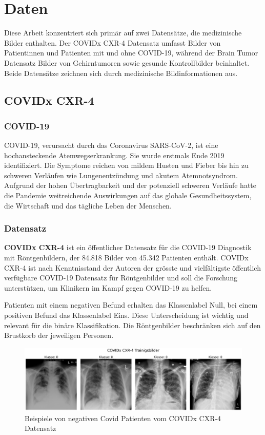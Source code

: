 \section{Daten}\label{chap:Daten} 
Diese Arbeit konzentriert sich primär auf zwei Datensätze, die medizinische Bilder enthalten. Der COVIDx CXR-4 Datensatz umfasst Bilder von Patientinnen und Patienten mit und ohne COVID-19, während der Brain Tumor Datensatz Bilder von Gehirntumoren sowie gesunde Kontrollbilder beinhaltet. Beide Datensätze zeichnen sich durch medizinische Bildinformationen aus.

\subsection{COVIDx CXR-4} \label{chap:COVIDx CXR-4}

\subsubsection{COVID-19} \label{chap:COVID-19}
COVID-19, verursacht durch das Coronavirus SARS-CoV-2, ist eine hochansteckende Atemwegserkrankung. Sie wurde erstmals Ende 2019 identifiziert. Die Symptome reichen von mildem Husten und Fieber bis hin zu schweren Verläufen wie Lungenentzündung und akutem Atemnotsyndrom. Aufgrund der hohen Übertragbarkeit und der potenziell schweren Verläufe hatte die Pandemie weitreichende Auswirkungen auf das globale Gesundheitssystem, die Wirtschaft und das tägliche Leben der Menschen.

\subsubsection{Datensatz} \label{chap:COVID19-datensatz}
\textbf{COVIDx CXR-4} \cite{wu_covidx_2023} ist ein öffentlicher Datensatz für die COVID-19 Diagnostik mit Röntgenbildern, der 84.818 Bilder von 45.342 Patienten enthält. COVIDx CXR-4 ist nach Kenntnisstand der Autoren der grösste und vielfältigste öffentlich verfügbare COVID-19 Datensatz für Röntgenbilder und soll die Forschung unterstützen, um Klinikern im Kampf gegen COVID-19 zu helfen.

Patienten mit einem negativen Befund erhalten das Klassenlabel Null, bei einem positiven Befund das Klassenlabel Eins. Diese Unterscheidung ist wichtig und relevant für die binäre Klassifikation. Die Röntgenbilder beschränken sich auf den Brustkorb der jeweiligen Personen.

\begin{figure}[H]
    \centering
    \includegraphics[width=\linewidth]{01-images/03-data/covid19-klasse0.png}
    \caption{Beispiele von negativen Covid Patienten vom COVIDx CXR-4 Datensatz}
    \label{fig:covid19-beispiele-klasse0-negativ}
\end{figure}

